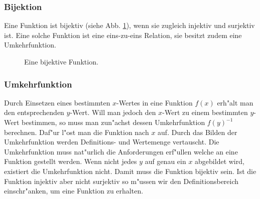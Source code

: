 \subsubsection{Bijektion}
Eine Funktion ist bijektiv (siehe Abb. \ref{fig:bijectiv}), wenn sie zugleich injektiv und surjektiv ist. Eine solche Funktion ist eine eins-zu-eins Relation, sie besitzt zudem eine Umkehrfunktion.
\begin{figure}[h!]
 \centering
 \caption{Eine bijektive Funktion.}
 \label{fig:bijectiv}
\end{figure}

\subsubsection{Umkehrfunktion}
Durch Einsetzen eines bestimmten $x$-Wertes in eine Funktion $f(x)$ erh"alt man den entsprechenden $y$-Wert. Will man jedoch den $x$-Wert zu einem bestimmten $y$-Wert bestimmen, so muss man zun"achst dessen Umkehrfunktion $f(y)^{-1}$ berechnen. Daf"ur l"ost man die Funktion nach $x$ auf. Durch das Bilden der Umkehrfunktion werden Definitions- und Wertemenge vertauscht. Die Umkehrfunktion muss nat"urlich die Anforderungen erf"ullen welche an eine Funktion gestellt werden. Wenn nicht jedes $y$ auf genau ein $x$ abgebildet wird, existiert die Umkehrfunktion nicht. Damit muss die Funktion bijektiv sein. Ist die Funktion injektiv aber nicht surjektiv so m"ussen wir den Definitionsbereich einschr"anken, um eine Funktion zu erhalten. 

